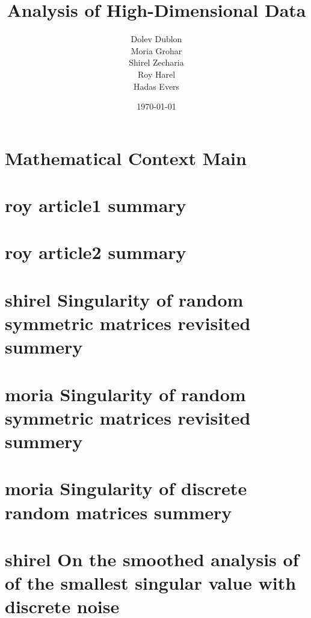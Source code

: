 \documentclass[12pt]{article}
\title{\textbf{Analysis of High-Dimensional Data}}
\author{
    Dolev Dublon\\
    Moria Grohar\\
    Shirel Zecharia\\
    Roy Harel\\
    Hadas Evers
}
\date{\today}
\begin{document}
\maketitle





\section{Mathematical Context Main}



\section{roy article1 summary}



\section{roy article2 summary}



\section{shirel Singularity of random symmetric matrices revisited summery}



\section{moria Singularity of random symmetric matrices revisited summery}



\section{moria Singularity of discrete random matrices summery}



\section{shirel On the smoothed analysis of of the smallest singular value with discrete noise}
\end{document}
